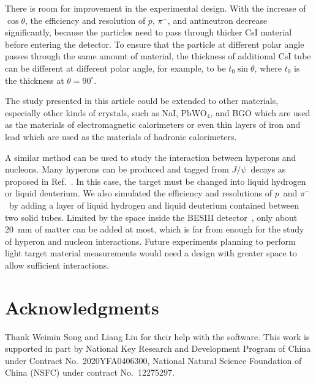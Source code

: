 \documentclass[aps,preprint,showkeys,superscriptaddress]{revtex4}
\newcommand{\chinese}[1]{\begin{CJK}{UTF8}{gbsn}#1\end{CJK}}
\newcommand{\red}[1]{\textcolor{red}{#1}}
\newcommand{\pp}{$p$}
\newcommand{\pim}{$\pi^-$}
\newcommand{\jpsi}{$J/\psi$}
\begin{document}
There is room for improvement in the experimental design. With the increase of
$\cos\theta$, the efficiency and resolution of \pp, $\pi^-$, and antineutron
decrease significantly, because the particles need to pass through thicker CsI
material before entering the detector. To ensure that the particle at different
polar angle passes through the same amount of material, the thickness of
additional CsI tube can be different at different polar angle, for example, to
be $t_0\sin\theta$, where $t_0$ is the thickness at $\theta=90^\circ$.
    
The study presented in this article could be extended to other materials,
especially other kinds of crystals, such as NaI, PbWO$_4$, and BGO which are used 
as the materials of electromagnetic calorimeters or even thin layers of iron 
and lead which are used as the materials of hadronic calorimeters. 

    
A similar method can be used to study the interaction between hyperons and
nucleons. Many hyperons can be produced and tagged from \jpsi\ decays as
proposed in Ref.~\cite{hypronProjectileFromJpsi}. In this case, the target must
be changed into liquid hydrogen or liquid deuterium. We also simulated the
efficiency and resolutions of \pp\ and \pim\ by adding a layer of liquid
hydrogen and liquid deuterium contained between two solid tubes. Limited by the
space inside the BESIII detector~\cite{bes3}, only about 20~mm of matter can be
added at most, which is far from enough for the study of hyperon and nucleon
interactions. Future experiments planning to perform light target material 
measurements would need a design with greater space to allow sufficient interactions.  
    
\section{Acknowledgments}

Thank Weimin Song and Liang Liu for their help with the software.
This work is supported in part by National Key Research and Development Program of China under Contract No.~2020YFA0406300, National Natural Science Foundation of China (NSFC) under contract No.~12275297.    
    
\end{document}
